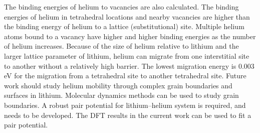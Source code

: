 The binding energies of helium to vacancies are also calculated. The binding energies of helium in tetrahedral locations and nearby vacancies are higher than the binding energy of helium to a lattice (substitutional) site. Multiple helium atoms bound to a vacancy have higher and higher binding energies as the number of helium increases. Because of the size of helium relative to lithium and the larger lattice parameter of lithium, helium can migrate from one interstitial site to another without a relatively high barrier. The lowest migration energy is 0.003 eV for the migration from a tetrahedral site to another tetrahedral site. Future work should study helium mobility through complex grain boundaries and surfaces in lithium. Molecular dynamics methods can be used to study grain boundaries. A robust pair potential for lithium--helium system is required, and needs to be developed. The DFT results in the current work can be used to fit a pair potential.




